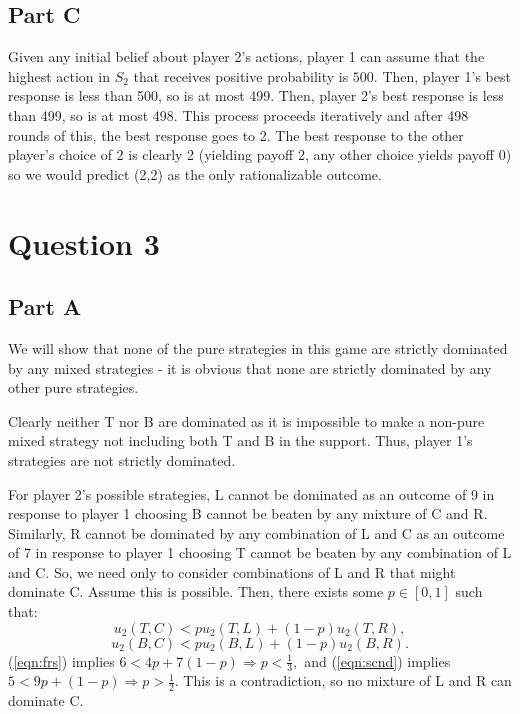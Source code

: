 \documentclass[11pt]{article} %
\begin{document}
\subsection{Part C}
Given any initial belief about player 2's actions, player 1 can assume that the highest action in $S_2$ that receives positive probability is $500.$ Then, player 1's best response is less than 500, so is at most 499. Then, player 2's best response is less than 499, so is at most 498. This process proceeds iteratively and after 498 rounds of this, the best response goes to 2. The best response to the other player's choice of 2 is clearly 2 (yielding payoff 2, any other choice yields payoff 0) so we would predict (2,2) as the only rationalizable outcome.

\section{Question 3}
\subsection{Part A}
We will show that none of the pure strategies in this game are strictly dominated by any mixed strategies - it is obvious that none are strictly dominated by any other pure strategies.

Clearly neither T nor B are dominated as it is impossible to make a non-pure mixed strategy not including both T and B in the support. Thus, player 1's strategies are not strictly dominated.

For player 2's possible strategies, L cannot be dominated as an outcome of 9 in response to player 1 choosing B cannot be beaten by any mixture of C and R. Similarly, R cannot be dominated by any combination of L and C as an outcome of 7 in response to player 1 choosing T cannot be beaten by any combination of L and C. So, we need only to consider combinations of L and R that might dominate C. Assume this is possible. Then, there exists some $p \in [0,1]$ such that:
\begin{equation}
u_2(T,C)<p u_2(T,L) + (1-p)u_2(T,R), \label{eqn:frs}
\end{equation}
\begin{equation}
u_2(B,C)<p u_2(B,L) + (1-p)u_2(B,R). \label{eqn:scnd}
\end{equation}
(\ref{eqn:frs}) implies $6<4p + 7(1-p)\Rightarrow p<\frac{1}{3},$ and (\ref{eqn:scnd}) implies $5<9p + (1-p) \Rightarrow p>\frac{1}{2}$. This is a contradiction, so no mixture of L and R can dominate C.
\end{document}
